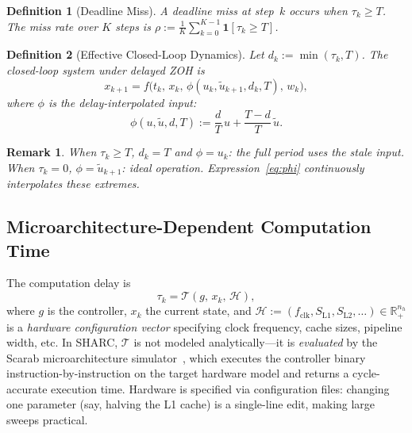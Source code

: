 \documentclass[conference]{IEEEtran}
\newcommand{\R}{\mathbb{R}}
\newcommand{\calH}{\mathcal{H}}
\newtheorem{definition}{Definition}
\newtheorem{remark}{Remark}
\begin{document}
\begin{definition}[Deadline Miss]\label{def:miss}
  A \emph{deadline miss} at step~$k$ occurs when $\tau_k \geq T$.
  The \emph{miss rate} over $K$ steps is
  $\rho := \frac{1}{K}\sum_{k=0}^{K-1}\mathbf{1}[\tau_k \geq T]$.
\end{definition}

\begin{definition}[Effective Closed-Loop Dynamics]\label{def:cl}
  Let $d_k := \min(\tau_k, T)$.
  The closed-loop system under delayed ZOH is
  \begin{equation}\label{eq:cl}
    x_{k+1} = f\!\bigl(t_k,\, x_k,\, \phi(u_k, \tilde{u}_{k+1},
    d_k, T),\, w_k\bigr),
  \end{equation}
  where $\phi$ is the delay-interpolated input:
  \begin{equation}\label{eq:phi}
    \phi(u, \tilde{u}, d, T) :=
    \frac{d}{T}\,u + \frac{T - d}{T}\,\tilde{u}.
  \end{equation}
\end{definition}

\begin{remark}
  When $\tau_k \geq T$, $d_k = T$ and $\phi = u_k$: the full period
  uses the stale input.  When $\tau_k = 0$, $\phi = \tilde{u}_{k+1}$:
  ideal operation.  Expression~\eqref{eq:phi} continuously
  interpolates these extremes.
\end{remark}

\subsection{Microarchitecture-Dependent Computation Time}

The computation delay is
\begin{equation}\label{eq:tau_model}
  \tau_k = \mathcal{T}(g,\, x_k,\, \calH),
\end{equation}
where $g$ is the controller, $x_k$ the current state, and
$\calH := (f_\text{clk}, S_\text{L1}, S_\text{L2}, \ldots)
\in \R_+^{n_h}$ is a \emph{hardware configuration vector} specifying
clock frequency, cache sizes, pipeline width, etc.  In SHARC,
$\mathcal{T}$ is not modeled analytically---it is \emph{evaluated} by
the Scarab microarchitecture simulator~\cite{scarab}, which executes
the controller binary instruction-by-instruction on the target hardware
model and returns a cycle-accurate execution time.  Hardware is
specified via configuration files: changing one parameter (say, halving
the L1 cache) is a single-line edit, making large sweeps practical.
\end{document}
